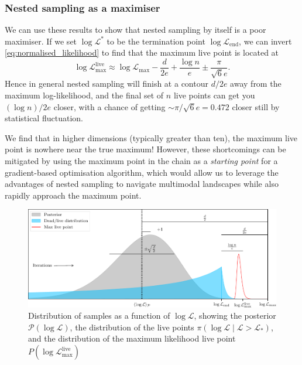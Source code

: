 \documentclass[usenatbib]{mnras}
\newcommand{\Like}{\mathcal{L}}
\begin{document}
\subsubsection*{Nested sampling as a maximiser}
We can use these results to show that nested sampling by itself is a poor maximiser. If we set $\log\Like^{*}$ to be the termination point $\log\Like_\mathrm{end}$, we can invert \cref{eq:normalised_likelihood} to find that the maximum live point is located at
\begin{equation}
    \boxed{
        \log{\mathcal{L}}_\mathrm{max}^\mathrm{live} \approx \log\mathcal{L}_\mathrm{max} - \frac{d}{2e} + \frac{\log n}{e} \pm \frac{\pi}{\sqrt{6}e}
    }.
\end{equation}
Hence in general nested sampling will finish at a contour $d/2e$ away from the maximum log-likelihood, and the final set of $n$ live points can get you $(\log n)/2e$ closer, with a chance of getting $\sim\pi/\sqrt{6}e=0.472$ closer still by statistical fluctuation. 
\par
We find that in higher dimensions (typically greater than ten), the maximum live point is nowhere near the true maximum! However, these shortcomings can be mitigated by using the maximum point in the chain as a \textit{starting point} for a gradient-based optimisation algorithm, which would allow us to leverage the advantages of nested sampling to navigate multimodal landscapes while also rapidly approach the maximum point.
\begin{figure}
\begin{center}
	\includegraphics{figures/anatomy.pdf}
\end{center}
\caption{Distribution of samples as a function of $\log\mathcal{L}$, showing the posterior $\mathcal{P}(\log\mathcal{L})$, the distribution of the live points $\mathcal{\pi}(\log\mathcal{L} \mid \mathcal{L}>\mathcal{L}_*)$, and the distribution of the maximum likelihood live point $P(\log\mathcal{L}_\mathrm{max}^\mathrm{live})$}
\label{fig:anatomy}
\end{figure}
\end{document}
